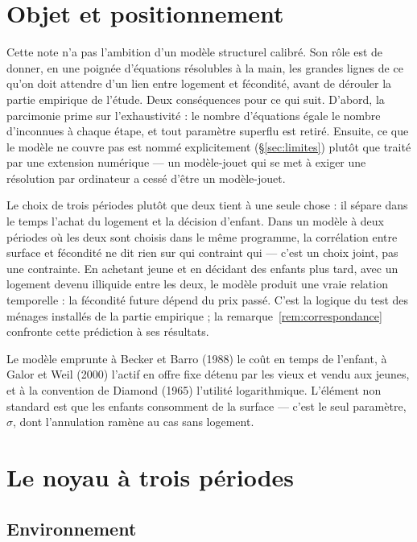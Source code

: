 \documentclass[11pt,a4paper]{article}
\theoremstyle{plain}
\theoremstyle{definition}
\begin{document}
\section{Objet et positionnement}

Cette note n'a pas l'ambition d'un modèle structurel calibré. Son rôle est de donner, en une poignée d'équations résolubles à la main, les grandes lignes de ce qu'on doit attendre d'un lien entre logement et fécondité, avant de dérouler la partie empirique de l'étude. Deux conséquences pour ce qui suit. D'abord, la parcimonie prime sur l'exhaustivité : le nombre d'équations égale le nombre d'inconnues à chaque étape, et tout paramètre superflu est retiré. Ensuite, ce que le modèle ne couvre pas est nommé explicitement (§\ref{sec:limites}) plutôt que traité par une extension numérique — un modèle-jouet qui se met à exiger une résolution par ordinateur a cessé d'être un modèle-jouet.

Le choix de trois périodes plutôt que deux tient à une seule chose : il sépare dans le temps l'achat du logement et la décision d'enfant. Dans un modèle à deux périodes où les deux sont choisis dans le même programme, la corrélation entre surface et fécondité ne dit rien sur qui contraint qui — c'est un choix joint, pas une contrainte. En achetant jeune et en décidant des enfants plus tard, avec un logement devenu illiquide entre les deux, le modèle produit une vraie relation temporelle : la fécondité future dépend du prix passé. C'est la logique du test des ménages installés de la partie empirique ; la remarque~\ref{rem:correspondance} confronte cette prédiction à ses résultats.

Le modèle emprunte à Becker et Barro (1988) le coût en temps de l'enfant, à Galor et Weil (2000) l'actif en offre fixe détenu par les vieux et vendu aux jeunes, et à la convention de Diamond (1965) l'utilité logarithmique. L'élément non standard est que les enfants consomment de la surface — c'est le seul paramètre, $\sigma$, dont l'annulation ramène au cas sans logement.

\section{Le noyau à trois périodes}\label{sec:noyau}

\subsection{Environnement}
\end{document}
